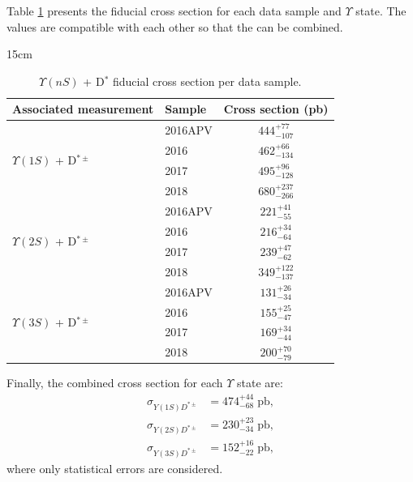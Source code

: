 Table \ref{tab:DPS_xsec} presents the fiducial cross section for each data sample and $\Upsilon$ state. The values are compatible with each other so that the can be combined.

\begin{table}[!htbp]{15cm}
  \caption{$\Upsilon(nS)$ + D$^{*}$ fiducial cross section per data sample.}
  \begin{tabular}{ l | l | c }
    \hline
    Associated measurement & Sample  & Cross section (pb)           \\ \hline
    \multirow[c]{4}{*}{$\Upsilon(1S)$ + D$^{*\pm}$}
                           & 2016APV & $444^{+77}_{-107}$ \bigstrut \\\cline{2-3}
                           & 2016    & $462^{+66}_{-134}$ \bigstrut \\\cline{2-3}
                           & 2017    & $495^{+96}_{-128}$ \bigstrut \\\cline{2-3}
                           & 2018    & $680^{+237}_{-266}$          \\ \hline
    \multirow[c]{4}{*}{$\Upsilon(2S)$ + D$^{*\pm}$}
                           & 2016APV & $221^{+41}_{-55}$ \bigstrut  \\\cline{2-3}
                           & 2016    & $216^{+34}_{-64}$ \bigstrut  \\\cline{2-3}
                           & 2017    & $239^{+47}_{-62}$ \bigstrut  \\\cline{2-3}
                           & 2018    & $349^{+122}_{-137}$          \\ \hline
    \multirow[c]{4}{*}{$\Upsilon(3S)$ + D$^{*\pm}$}
                           & 2016APV & $131^{+26}_{-34}$ \bigstrut  \\\cline{2-3}
                           & 2016    & $155^{+25}_{-47}$ \bigstrut  \\\cline{2-3}
                           & 2017    & $169^{+34}_{-44}$ \bigstrut  \\\cline{2-3}
                           & 2018    & $200^{+70}_{-79}$            \\ \hline
  \end{tabular}
  \label{tab:DPS_xsec}
\end{table}

Finally, the combined cross section for each $\Upsilon$ state are:
\begin{equation}
  \begin{split}
    \sigma_{Y(1S)D^{*\pm}} &= 474^{+44}_{-68} \; \text{pb},\\
    \sigma_{Y(2S)D^{*\pm}} &= 230^{+23}_{-34} \; \text{pb},\\
    \sigma_{Y(3S)D^{*\pm}} &= 152^{+16}_{-22} \; \text{pb},
  \end{split}
\end{equation}
where only statistical errors are considered.

